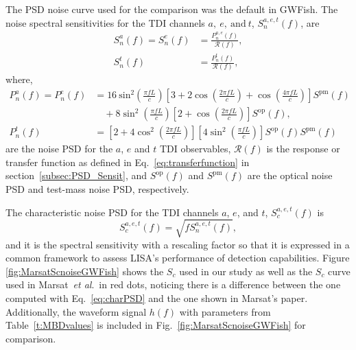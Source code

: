 \documentclass[a4paper,12pt]{article}
\begin{document}
The PSD noise curve used for the comparison was the default in GWFish. The noise spectral sensitivities for the TDI channels $a,~e,~\mathrm{and}~t$, $S^{a,e,t}_n(f)$, are
\begin{subequations}
\begin{align}
S^{a}_n(f) = S^{e}_n(f) 
&= \frac{P^{a,e}_n(f)}{\mathcal{R}(f)},
\label{redPSDa} \\
S^{t}_n(f) 
&= \frac{P^{t}_n(f)}{\mathcal{R}(f)},
\label{redPSDb}
\end{align}
\end{subequations}
where,
\begin{subequations}
\begin{align}
P^{a}_n(f) = P^{e}_n(f) 
&= 16~\mathrm{sin}^{2}\left(\frac{\pi f L}{c}\right)\left[3+2\cos\left(\frac{2\pi fL}{c}\right)+ \cos\left(\frac{4\pi fL}{c}\right)\right]S^{\mathrm{pm}}(f) \nonumber \\
&\quad +8\sin^{2}\left(\frac{\pi fL}{c}\right)\left[2+\cos\left(\frac{2 \pi fL}{c}\right)\right]S^{\mathrm{op}}(f),
\label{redPSDrespa} \\
P^{t}_n(f)  
&= \left[2+4\cos^{2}\left(\frac{2\pi fL}{c}\right)\right]\left[4\sin^{2}\left(\frac{\pi fL}{c}\right)\right]S^{\mathrm{op}}(f)S^{\mathrm{pm}}(f)\,
\label{redPSDrespb}
\end{align}
\end{subequations}
are the noise PSD for the $a$, $e$ and $t$ TDI observables, $\mathcal{R}(f)$ is the response or transfer function as defined in Eq.~\eqref{eq:transferfunction} in section~\ref{subsec:PSD_Sensit}, and $S^{\text{op}}(f)$ and $S^{\text{pm}}(f)$ are the optical noise PSD and test-mass noise PSD, respectively.

The characteristic noise PSD for the TDI channels $a$, $e$, and $t$, $S^{a,e,t}_c(f)$ is
\begin{equation}
S^{a,e,t}_c(f) = \sqrt{f S^{a,e,t}_n(f)},
\label{eq:charPSD}
\end{equation}
and it is the spectral sensitivity with a rescaling factor so that it is expressed in a common framework to assess LISA's performance of detection capabilities. Figure \ref{fig:MarsatScnoiseGWFish} shows the $S_c$ used in our study as well as the $S_c$ curve used in Marsat~\textit{et al}.\ in red dots, noticing there is a difference between the one computed with Eq.~\eqref{eq:charPSD} and the one shown in Marsat's paper. Additionally, the waveform signal $h(f)$ with parameters from Table~\ref{t:MBDvalues} is included in Fig.~\ref{fig:MarsatScnoiseGWFish} for comparison.
\end{document}
